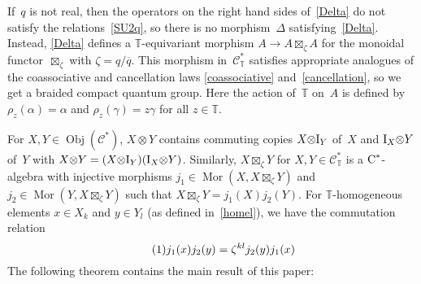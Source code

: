\documentclass[a4paper]{amsart}
\numberwithin{equation}{section}
\theoremstyle{definition}
\theoremstyle{remark}
\begin{document}
If~$q$ is not real, then the operators on the right hand sides
of~\eqref{Delta} do not satisfy the relations~\eqref{SU2q}, so there
is no morphism~$\Delta$ satisfying~\eqref{Delta}.  Instead,
\eqref{Delta} defines a \(\mathbb{T}\){\nobreakdash}-equivariant morphism
\({{A}}\to {{A}}{\boxtimes}_\zeta {{A}}\) for the monoidal
functor~${\boxtimes}_\zeta$ with $\zeta = q/{\overline{q}}$.  This morphism
in~$\mathcal{C}^*_{\mathbb{T}}$ satisfies appropriate analogues of
the coassociative and cancellation laws \eqref{coassociative}
and~\eqref{cancellation}, so we get a braided compact quantum group.
Here the action of~\(\mathbb{T}\) on~\(A\) is defined by
\(\rho_z(\alpha)=\alpha\) and \(\rho_z(\gamma)=z\gamma\) for all
\(z\in\mathbb{T}\).

For $X,Y\in\operatorname{\mathrm{Obj}}(\mathcal{C}^*)$, $X{\otimes} Y$ contains commuting
copies $X{\otimes}{\textup{I}}_{Y}$ of~$X$ and ${\textup{I}}_{X}{\otimes} Y$ of~$Y$ with
\(X{\otimes} Y=(X{\otimes}{\textup{I}}_{Y})({\textup{I}}_{X}{\otimes} Y)\).  Similarly,
$X{\boxtimes}_\zeta Y$ for $X,Y\in\mathcal{C}^*_{\mathbb{T}}$ is a
${\textup{C}^*}${\nobreakdash}-algebra with injective morphisms
$j_{1}\in{\operatorname{Mor}}(X,X{\boxtimes}_\zeta Y)$ and $j_{2}\in{\operatorname{Mor}}(Y,X{\boxtimes}_\zeta
Y)$ such that $X{\boxtimes}_\zeta Y = j_{1}(X)j_{2}(Y)$.  For
$\mathbb{T}${\nobreakdash}-homogeneous elements $x\in X_k$ and $y\in Y_l$ (as
defined in~\eqref{homel}), we have the commutation relation
\[
{\label{{com}}\stepcounter{equation}\tag{\theequation}}
j_{1}(x)j_{2}(y)=\zeta^{k l}j_{2}(y)j_{1}(x)
\]
The following theorem contains the main result of this paper:
\end{document}

